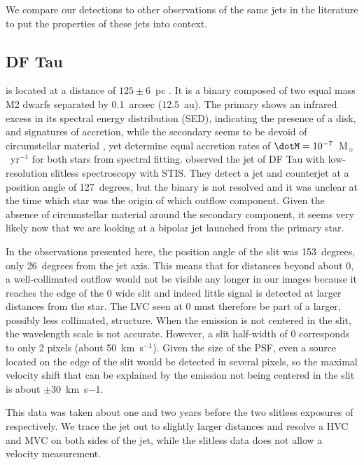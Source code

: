 \documentclass[twocolumn]{aastex62}
\begin{document}
We compare our detections to other observations of the same jets in the literature to put the properties of these jets into context.

\subsection{DF Tau}

 is located at a distance of $125\pm6$~pc \citep{2016A&A...595A...1G,2018A&A...616A...1G}. It is a binary composed of two equal mass M2 dwarfs separated by 0.1~arcsec (12.5~au). The primary shows an infrared excess in its spectral energy distribution (SED), indicating the presence of a disk, and signatures of accretion, while the secondary seems to be devoid of circumstellar material \citep{2017ApJ...845..161A}, yet \citet{2003ApJ...583..334H} determine equal accretion rates of $\dotM=10^{-7}$~M$_{\sun}$~yr$^{-1}$ for both stars from spectral fitting.
\citet{2004ApJ...609..261H} observed the jet of DF Tau with low-resolution slitless spectroscopy with STIS. They detect a jet and counterjet at a
position angle of 127~degrees, but the binary is not resolved and it was unclear at the time which star was the origin of which outflow component. Given the absence of circumstellar material around the secondary component, it seems very likely now that we are looking at a bipolar jet launched from the primary star. 

In the observations presented here, the position angle of the slit was 153~degrees, only 26~degrees from the jet axis. This means that for distances beyond about 0, a well-collimated outflow would not be visible any longer in our images because it reaches the edge of the 0 wide slit and indeed little signal is detected at larger distances from the star. The LVC seen at 0 must therefore be part of a larger, possibly less collimated, structure. When the emission is not centered in the slit, the wavelength scale is not accurate. However, a slit half-width of 0 corresponds to only 2 pixels (about 50~km~s$^{-1}$). Given the size of the PSF, even a source located on the edge of the slit would be detected in several pixels, so the maximal velocity shift that can be explained by the emission not being centered in the slit is about $\pm30$~km~s${-1}$.

This data was taken about one and two years before the two slitless exposures of \citet{2004ApJ...609..261H} respectively. We trace the jet out to slightly larger distances and resolve a HVC and MVC on both sides of the jet, while the slitless data does not allow a velocity measurement.
\end{document}
